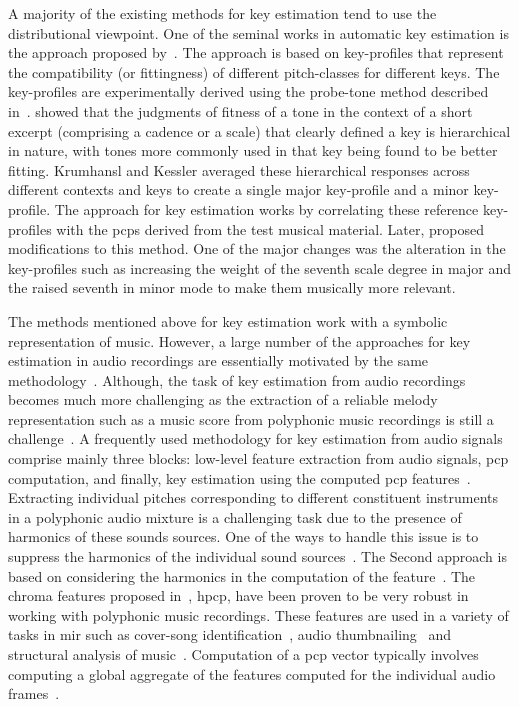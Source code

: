 A majority of the existing methods for key estimation tend to use the distributional viewpoint. One of the seminal works in automatic key estimation is the approach proposed by~\cite{KrumhanslKessler82,krumhansl2001cognitive}. The approach is based on key-profiles that represent the compatibility (or fittingness) of different pitch-classes for different keys. The key-profiles are experimentally derived using the probe-tone method described in~\cite{krumhansl1979quantification}. \cite{krumhansl1979quantification} showed that the judgments of fitness of a tone in the context of a short excerpt (comprising a cadence or a scale) that clearly defined a key is hierarchical in nature, with tones more commonly used in that key being found to be better fitting. Krumhansl and Kessler averaged these hierarchical responses across different contexts and keys to create a single major key-profile and a minor key-profile. The approach for key estimation works by correlating these reference key-profiles with the \glspl{pcp} derived from the test musical material. Later, \cite{temperley1999s} proposed modifications to this method. One of the major changes was the alteration in the key-profiles such as increasing the weight of the seventh scale degree in major and the raised seventh in minor mode to make them musically more relevant. 

The methods mentioned above for key estimation work with a symbolic representation of music. However, a large number of the approaches for key estimation in audio recordings are essentially motivated by the same methodology~\citep{gomez2006tonal,pauws2004musical,peeters2006chroma}. Although, the task of key estimation from audio recordings becomes much more challenging as the extraction of a reliable melody representation such as a music score from polyphonic music recordings is still a challenge~\citep{gomez2006tonal}. A frequently used methodology for key estimation from audio signals comprise mainly three blocks: low-level feature extraction from audio signals, \gls{pcp} computation, and finally, key estimation using the computed \gls{pcp} features~\citep{peeters2006chroma}. Extracting individual pitches corresponding to different constituent instruments in a polyphonic audio mixture is a challenging task due to the presence of harmonics of these sounds sources. One of the ways to handle this issue is to suppress the harmonics of the individual sound sources~\citep{cremer2004a,peeters2006chroma}. The Second approach is based on considering the harmonics in the computation of the feature~\citep{gomez2006tonal,izmirli2005template}. The chroma features proposed in~\cite{gomez2006tonal}, \gls{hpcp}, have been proven to be very robust in working with polyphonic music recordings. These features are used in a variety of tasks in \gls{mir} such as cover-song identification~\citep{joan_thesis}, audio thumbnailing~\citep{bartsch2001catch} and structural analysis of music~\citep{paulus2006music}. Computation of a \gls{pcp} vector typically involves computing a global aggregate of the features computed for the individual audio frames~\citep{izmirli2005template,pauws2004musical}. 

